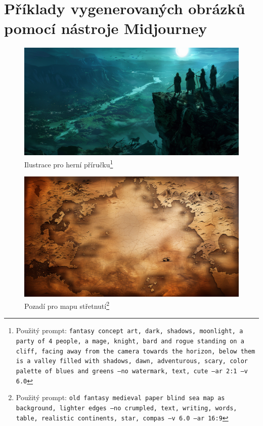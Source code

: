 \chapter{Příklady vygenerovaných obrázků pomocí nástroje Midjourney}

\begin{figure}
  \begin{minipage}{\textwidth}
    \centering
    \includegraphics[width=\textwidth]{resources/figures/theme.png}
    \caption[Ilustrace pro herní příručku]{Ilustrace pro herní příručku\footnote[1]{Použitý prompt: \texttt{fantasy concept art, dark, shadows, moonlight, a party of 4 people, a mage, knight, bard and rogue standing on a cliff, facing away from the camera towards the horizon, below them is a valley filled with shadows, dawn, adventurous, scary, color palette of blues and greens --no watermark, text, cute --ar 2:1 --v 6.0}}}
    \label{fig:theme}
  \end{minipage}
\end{figure}

\begin{figure}
  \begin{minipage}{\textwidth}
    \centering
    \includegraphics[width=\textwidth]{resources/figures/map.png}
    \caption[Pozadí pro mapu střetnutí]{Pozadí pro mapu střetnutí\footnote[2]{Použitý prompt: \texttt{old fantasy medieval paper blind sea map as background, lighter edges --no crumpled, text, writing, words, table, realistic continents, star, compas --v 6.0 --ar 16:9}}}
    \label{fig:map}
  \end{minipage}
\end{figure}

